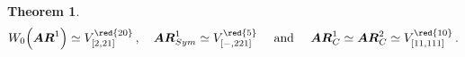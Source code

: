 \documentclass[11pt]{amsart}
\newcommand{\sk}{\smallskip}
\newtheorem{thm}{Theorem}[section]
\begin{document}
\begin{thm}
\begin{equation}
\label{Eq:1AR-Representations}
W_0\Big(
\boldsymbol{AR}^1\Big)\simeq V_{[2,21]}^{{\red{20}}}\, , \quad 
\boldsymbol{AR}^1_{Sym}\simeq V_{[-,221]}^{{\red{5}}}
\quad 
\mbox{ and }
\quad 
\boldsymbol{AR}^1_C\simeq \boldsymbol{AR}^2_C\simeq V_{[11,111]}^{{\red{10}}}\,.
\end{equation}
\end{thm}
\end{document}
